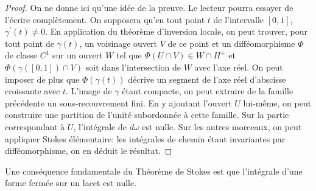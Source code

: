 \begin{proof}
On ne donne ici qu'une idée de la preuve. Le lecteur pourra essayer de l'écrire
complètement. On supposera qu'en tout point $t$
de l'intervalle $[0,1]$, $\gamma^\prime(t) \neq 0$. En application du théorème d'inversion locale, on peut
trouver, pour tout point de $\gamma(t)$, un voisinage ouvert  $V$ de ce point et
un difféomorphisme $\Phi$ de classe $C^1$ sur un ouvert $W$ tel que
$\Phi(U\cap V) \in W\cap H^+$ et $\Phi(\gamma([0,1])\cap V)$ soit dans
l'intersection de $W$ avec l'axe réel. On peut imposer de plus
que $\Phi(\gamma(t))$ décrive un segment de l'axe réel d'abscisse croissante
avec $t$. L'image de $\gamma$ étant compacte, on peut extraire de la famille
précédente un sous-recouvrement fini. En y ajoutant l'ouvert $U$ lui-m\^eme, 
on peut construire une partition de l'unité subordonnée à cette famille. 
Sur la partie correspondant à $U$, l'intégrale de $d\omega$ est nulle.
 Sur les autres morceaux, on peut appliquer Stokes élémentaire: 
 les intégrales de chemin étant invariantes par difféomorphisme, on en déduit le
résultat.
\end{proof}
\begin{rem}
Une conséquence fondamentale du Théorème de Stokes est que l'intégrale d'une
forme fermée sur un lacet est nulle.
\end{rem}
\newpage
{}
\vskip 12pt
